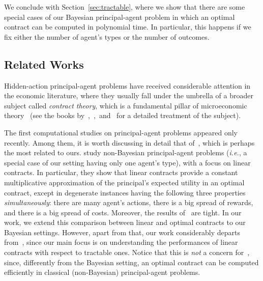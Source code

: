 We conclude with Section~\ref{sec:tractable}, where we show that there are some special cases of our Bayesian principal-agent problem in which an optimal contract can be computed in polynomial time.
%
In particular, this happens if we fix either the number of agent's types or the number of outcomes. 


\subsection{Related Works}

Hidden-action principal-agent problems have received considerable attention in the economic literature, where they usually fall under the umbrella of a broader subject called \emph{contract theory}, which is a fundamental pillar of microeconomic theory~\citep{shavell1979risk,grossman1983analysis,rogerson1985repeated,holmstrom1991multitask} (see the books by~\citet{mas1995microeconomic},~\citet{bolton2005contract},~and~\citet{laffont2009theory} for a detailed treatment of the subject).


The first computational studies on principal-agent problems appeared only recently.
%
Among them, it is worth discussing in detail that of~\citet{dutting2019simple}, which is perhaps the most related to ours.
%
\citet{dutting2019simple} study non-Bayesian principal-agent problems (\emph{i.e.}, a special case of our setting having only one agent's type), with a focus on linear contracts.
%
In particular, they show that linear contracts provide a constant multiplicative approximation of the principal's expected utility in an optimal contract, except in degenerate instances having the following three properties \emph{simultaneously}: there are many agent's actions, there is a big spread of rewards, and there is a big spread of costs.
%
Moreover, the results of~\citet{dutting2019simple} are tight.
%
In our work, we extend this comparison between linear and optimal contracts to our Bayesian settings.
%
However, apart from that, our work considerably departs from~\citep{dutting2019simple}, since our main focus is on understanding the performances of linear contracts with respect to tractable ones.
%
Notice that this is \emph{not} a concern for~\citet{dutting2019simple}, since, differently from the Bayesian setting, an optimal contract can be computed efficiently in classical (non-Bayesian) principal-agent problems.

